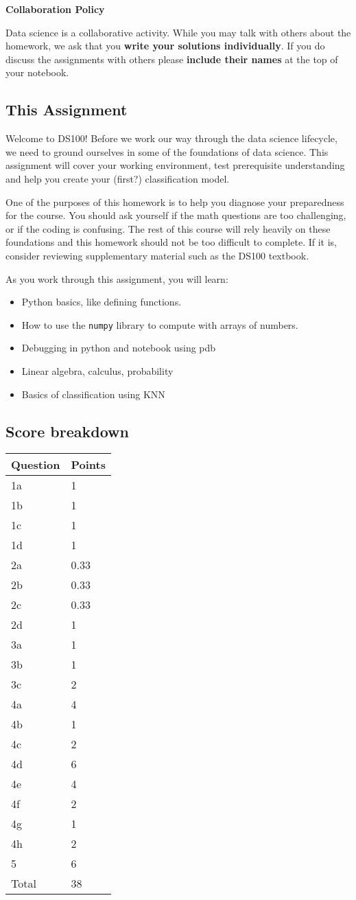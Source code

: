 \documentclass[11pt]{article}
\providecommand{\tightlist}{%
      \setlength{\itemsep}{0pt}\setlength{\parskip}{0pt}}
\begin{document}
\textbf{Collaboration Policy}

Data science is a collaborative activity. While you may talk with others
about the homework, we ask that you \textbf{write your solutions
individually}. If you do discuss the assignments with others please
\textbf{include their names} at the top of your notebook.

\subsection{This Assignment}\label{this-assignment}

Welcome to DS100! Before we work our way through the data science
lifecycle, we need to ground ourselves in some of the foundations of
data science. This assignment will cover your working environment, test
prerequisite understanding and help you create your (first?)
classification model.

One of the purposes of this homework is to help you diagnose your
preparedness for the course. You should ask yourself if the math
questions are too challenging, or if the coding is confusing. The rest
of this course will rely heavily on these foundations and this homework
should not be too difficult to complete. If it is, consider reviewing
supplementary material such as the DS100 textbook.

As you work through this assignment, you will learn:

\begin{itemize}
\tightlist
\item
  Python basics, like defining functions.
\item
  How to use the \texttt{numpy} library to compute with arrays of
  numbers.
\item
  Debugging in python and notebook using pdb
\item
  Linear algebra, calculus, probability
\item
  Basics of classification using KNN
\end{itemize}

\subsection{Score breakdown}\label{score-breakdown}

\begin{longtable}[]{@{}ll@{}}
\toprule
Question & Points\tabularnewline
\midrule
\endhead
1a & 1\tabularnewline
1b & 1\tabularnewline
1c & 1\tabularnewline
1d & 1\tabularnewline
2a & 0.33\tabularnewline
2b & 0.33\tabularnewline
2c & 0.33\tabularnewline
2d & 1\tabularnewline
3a & 1\tabularnewline
3b & 1\tabularnewline
3c & 2\tabularnewline
4a & 4\tabularnewline
4b & 1\tabularnewline
4c & 2\tabularnewline
4d & 6\tabularnewline
4e & 4\tabularnewline
4f & 2\tabularnewline
4g & 1\tabularnewline
4h & 2\tabularnewline
5 & 6\tabularnewline
Total & 38\tabularnewline
\bottomrule
\end{longtable}
\end{document}
